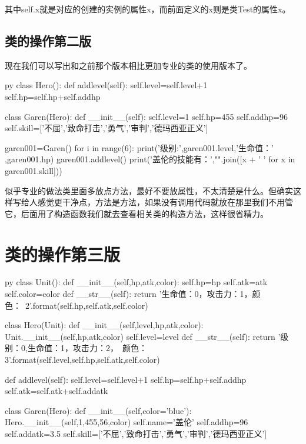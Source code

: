 \documentclass[12pt,oneside]{book}
\begin{document}
\begin{common-format}
其中self.x就是对应的创建的实例的属性x，而前面定义的x则是类Test的属性x。

\subsection{类的操作第二版}
现在我们可以写出和之前那个版本相比更加专业的类的使用版本了。
\begin{xverbatim}[129]{py}
class Hero():
    def addlevel(self):
        self.level=self.level+1
        self.hp=self.hp+self.addhp

class Garen(Hero):
    def __init__(self):
        self.level=1
        self.hp=455
        self.addhp=96
        self.skill=['不屈','致命打击','勇气','审判','德玛西亚正义']

garen001=Garen()
for i in range(6):
    print('级别:',garen001.level,'生命值：' ,garen001.hp)
    garen001.addlevel()
print('盖伦的技能有：',"".join([x + '  ' for x in garen001.skill]))
\end{xverbatim}

似乎专业的做法类里面多放点方法，最好不要放属性，不太清楚是什么。但确实这样写给人感觉更干净点，方法是方法，如果没有调用代码就放在那里我们不用管它，后面用了构造函数我们就去查看相关类的构造方法，这样很省精力。


\section{类的操作第三版}
\label{sec:类的操作第三版}
\begin{xverbatim}[129]{py}
class Unit():
    def __init__(self,hp,atk,color):
        self.hp=hp
        self.atk=atk
        self.color=color
    def __str__(self):
        return '生命值：{0}，攻击力：{1}，颜色：\
        {2}'.format(self.hp,self.atk,self.color)

class Hero(Unit):
    def __init__(self,level,hp,atk,color):
        Unit.__init__(self,hp,atk,color)
        self.level=level
    def __str__(self):
        return '级别：{0},生命值：{1}，攻击力：{2}，\
        颜色：{3}'.format(self.level,self.hp,self.atk,self.color)

    def addlevel(self):
        self.level=self.level+1
        self.hp=self.hp+self.addhp
        self.atk=self.atk+self.addatk

class Garen(Hero):
    def __init__(self,color='blue'):
        Hero.__init__(self,1,455,56,color)
        self.name='盖伦'
        self.addhp=96
        self.addatk=3.5
        self.skill=['不屈','致命打击','勇气','审判','德玛西亚正义']


\end{xverbatim}
\end{common-format}
\end{document}

